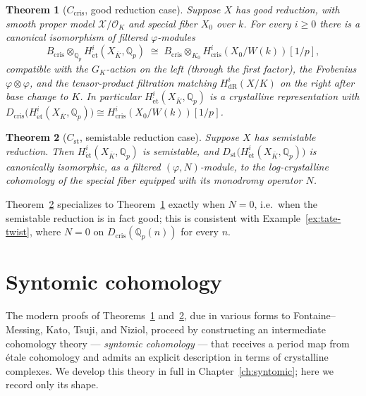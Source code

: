 \documentclass[10pt]{amsbook}
\newtheorem{theorem}{Theorem}[chapter]
\theoremstyle{definition}
\theoremstyle{remark}
\newcommand{\Qp}{\mathbb{Q}_p}
\begin{document}
\begin{theorem}[$C_{\mathrm{cris}}$, good reduction case]\label{thm:ccris}
Suppose $X$ has good reduction, with smooth proper model $\mathcal{X}/\mathcal{O}_K$ and
special fiber $X_0$ over $k$. For every $i \geq 0$ there is a canonical isomorphism of
filtered $\varphi$-modules
\[
  B_{\mathrm{cris}} \otimes_{\Qp} H^i_{\mathrm{\acute et}}(X_{\overline K}, \Qp)
  \;\cong\;
  B_{\mathrm{cris}} \otimes_{K_0} H^i_{\mathrm{cris}}(X_0/W(k))[1/p],
\]
compatible with the $G_K$-action on the left (through the first factor), the Frobenius
$\varphi \otimes \varphi$, and the tensor-product filtration matching
$H^i_{\mathrm{dR}}(X/K)$ on the right after base change to $K$. In particular
$H^i_{\mathrm{\acute et}}(X_{\overline K}, \Qp)$ is a crystalline representation with
$D_{\mathrm{cris}}\bigl(H^i_{\mathrm{\acute et}}(X_{\overline K}, \Qp)\bigr) \cong
H^i_{\mathrm{cris}}(X_0/W(k))[1/p]$.
\end{theorem}

\begin{theorem}[$C_{\mathrm{st}}$, semistable reduction case]\label{thm:cst}
Suppose $X$ has semistable reduction. Then $H^i_{\mathrm{\acute et}}(X_{\overline K}, \Qp)$ is
semistable, and $D_{\mathrm{st}}\bigl(H^i_{\mathrm{\acute et}}(X_{\overline K},\Qp)\bigr)$ is
canonically isomorphic, as a filtered $(\varphi,N)$-module, to the log-crystalline cohomology
of the special fiber equipped with its monodromy operator $N$.
\end{theorem}

Theorem~\ref{thm:cst} specializes to Theorem~\ref{thm:ccris} exactly when $N = 0$, i.e.\ when
the semistable reduction is in fact good; this is consistent with Example~\ref{ex:tate-twist},
where $N = 0$ on $D_{\mathrm{cris}}(\Qp(n))$ for every $n$.

\section{Syntomic cohomology}
\label{sec:syntomic-intro}

The modern proofs of Theorems~\ref{thm:ccris} and~\ref{thm:cst}, due in various forms to
Fontaine--Messing, Kato, Tsuji, and Niziol, proceed by constructing an intermediate
cohomology theory — \emph{syntomic cohomology} — that receives a period map from étale
cohomology and admits an explicit description in terms of crystalline complexes. We develop
this theory in full in Chapter~\ref{ch:syntomic}; here we record only its shape.
\end{document}

